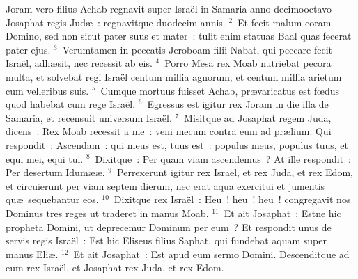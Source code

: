 \lettrine[lines=10,image=true,loversize=0.05,lraise=-0.03]{J}{}oram vero filius Achab regnavit super Isra\"el in Samaria anno decimooctavo Josaphat regis Jud\ae~: regnavitque duodecim annis.
${}^{2}$~Et fecit malum coram Domino, sed non sicut pater suus et mater~: tulit enim statuas Baal quas fecerat pater ejus.
${}^{3}$~Verumtamen in peccatis Jeroboam filii Nabat, qui peccare fecit Isra\"el, adh\ae sit, nec recessit ab eis.
${}^{4}$~Porro Mesa rex Moab nutriebat pecora multa, et solvebat regi Isra\"el centum millia agnorum, et centum millia arietum cum velleribus suis.
${}^{5}$~Cumque mortuus fuisset Achab, pr\ae varicatus est fœdus quod habebat cum rege Isra\"el.
${}^{6}$~Egressus est igitur rex Joram in die illa de Samaria, et recensuit universum Isra\"el.
${}^{7}$~Misitque ad Josaphat regem Juda, dicens~: Rex Moab recessit a me~: veni mecum contra eum ad pr\ae lium. Qui respondit~: Ascendam~: qui meus est, tuus est~: populus meus, populus tuus, et equi mei, equi tui.
${}^{8}$~Dixitque~: Per quam viam ascendemus~? At ille respondit~: Per desertum Idum\ae \ae .
${}^{9}$~Perrexerunt igitur rex Isra\"el, et rex Juda, et rex Edom, et circuierunt per viam septem dierum, nec erat aqua exercitui et jumentis qu\ae\ sequebantur eos.
${}^{10}$~Dixitque rex Isra\"el~: Heu~! heu~! heu~! congregavit nos Dominus tres reges ut traderet in manus Moab.
${}^{11}$~Et ait Josaphat~: Estne hic propheta Domini, ut deprecemur Dominum per eum~? Et respondit unus de servis regis Isra\"el~: Est hic Eliseus filius Saphat, qui fundebat aquam super manus Eli\ae .
${}^{12}$~Et ait Josaphat~: Est apud eum sermo Domini. Descenditque ad eum rex Isra\"el, et Josaphat rex Juda, et rex Edom.


